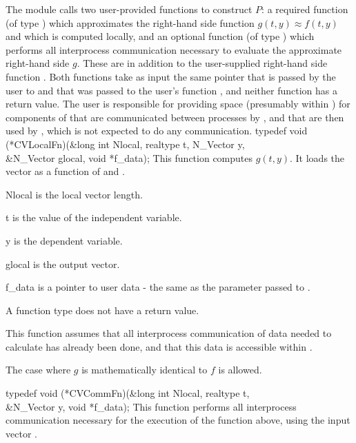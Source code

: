 The {\cvbbdpre} module calls two user-provided functions to construct $P$: 
a required function  (of type ) 
which approximates the right-hand side function $g(t,y) \approx f(t,y)$ and which 
is computed locally, and an optional function  (of type ) which performs 
all interprocess communication necessary to evaluate the approximate right-hand
side $g$.  These are in addition to the user-supplied right-hand side function
.  Both functions take as input the same pointer  that is passed
by the user to  and that was passed to the user's function ,
and neither function has a return value. The user is responsible for
providing space (presumably within ) for components of 
that are communicated between processes by , and that are
then used by , which is not expected to do any communication.
{
  typedef void (*CVLocalFn)(&long int Nlocal, realtype t, N\_Vector y, \\
                            &N\_Vector glocal, void *f\_data);
}
{
  This function computes $g(t,y)$. It loads the vector
   as a function of  and .  
}
{
  \begin{args}[Nlocal]
  \item[Nlocal] 
    is the local vector length.
  \item[t]
    is the value of the independent variable.
  \item[y]
    is the dependent variable. 
  \item[glocal]
    is the output vector.
  \item[f\_data]
    is a pointer to user data - the same as the       
    parameter passed to .  
  \end{args}
}
{
  A  function type does not have a return value.
}
{
  This function assumes that all interprocess communication of data needed to 
  calculate  has already been done, and that this data is accessible within
  .

  The case where $g$ is mathematically identical to $f$ is allowed.
}
{
  typedef void (*CVCommFn)(&long int Nlocal, realtype t,  \\
                           &N\_Vector y, void *f\_data);
}
{
  This function performs all interprocess communication necessary 
  for the execution of the  function above, using the input vector .
}
